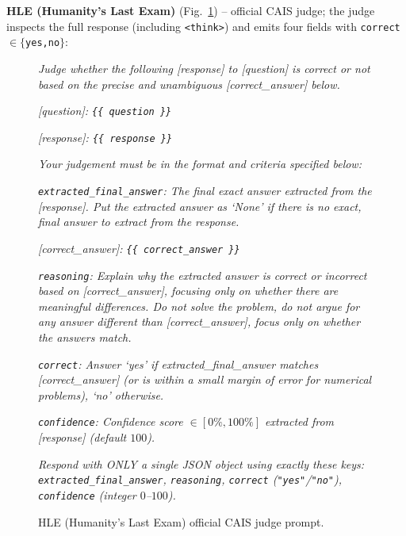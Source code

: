 \documentclass{llmxive}
\begin{document}
\textbf{HLE (Humanity's Last Exam)} (Fig.~\ref{fig:prompt-judge-hle}) -- official CAIS judge; the judge inspects the full response (including \texttt{<think>}) and emits four fields with \texttt{correct} $\in\{$\texttt{yes,no}$\}$:
\begin{figure}[!htbp]
\begin{prompttemplatefig}
\small
\emph{Judge whether the following [response] to [question] is correct or not based on the precise and unambiguous [correct\_answer] below.}

\emph{[question]: \texttt{\{\{ question \}\}}}

\emph{[response]: \texttt{\{\{ response \}\}}}

\emph{Your judgement must be in the format and criteria specified below:}

\emph{\texttt{extracted\_final\_answer}: The final exact answer extracted from the [response]. Put the extracted answer as `None' if there is no exact, final answer to extract from the response.}

\emph{[correct\_answer]: \texttt{\{\{ correct\_answer \}\}}}

\emph{\texttt{reasoning}: Explain why the extracted answer is correct or incorrect based on [correct\_answer], focusing only on whether there are meaningful differences. Do not solve the problem, do not argue for any answer different than [correct\_answer], focus only on whether the answers match.}

\emph{\texttt{correct}: Answer `yes' if extracted\_final\_answer matches [correct\_answer] (or is within a small margin of error for numerical problems), `no' otherwise.}

\emph{\texttt{confidence}: Confidence score $\in[0\%,100\%]$ extracted from [response] (default $100$).}

\emph{Respond with ONLY a single JSON object using exactly these keys: \texttt{extracted\_final\_answer}, \texttt{reasoning}, \texttt{correct} (\texttt{"yes"}/\texttt{"no"}), \texttt{confidence} (integer $0$--$100$).}
\end{prompttemplatefig}
\caption{HLE (Humanity's Last Exam) official CAIS judge prompt.}
\label{fig:prompt-judge-hle}
\end{figure}
\end{document}
